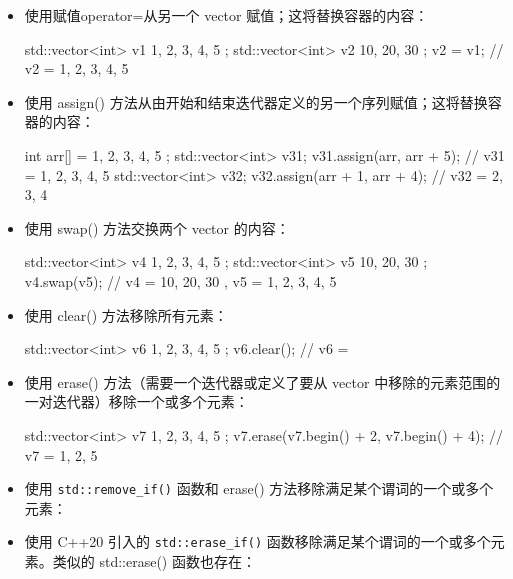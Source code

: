 \begin{itemize}
\item
使用赋值operator=从另一个 vector 赋值；这将替换容器的内容：

\begin{cpp}
std::vector<int> v1{ 1, 2, 3, 4, 5 };
std::vector<int> v2{ 10, 20, 30 };
v2 = v1; // v2 = { 1, 2, 3, 4, 5 }
\end{cpp}

\item
使用 assign() 方法从由开始和结束迭代器定义的另一个序列赋值；这将替换容器的内容：

\begin{cpp}
int arr[] = { 1, 2, 3, 4, 5 };
std::vector<int> v31;
v31.assign(arr, arr + 5);     // v31 = { 1, 2, 3, 4, 5 }
std::vector<int> v32;
v32.assign(arr + 1, arr + 4); // v32 = { 2, 3, 4 }
\end{cpp}

\item
使用 swap() 方法交换两个 vector 的内容：

\begin{cpp}
std::vector<int> v4{ 1, 2, 3, 4, 5 };
std::vector<int> v5{ 10, 20, 30 };
v4.swap(v5); // v4 = { 10, 20, 30 }, v5 = { 1, 2, 3, 4, 5 }
\end{cpp}

\item
使用 clear() 方法移除所有元素：

\begin{cpp}
std::vector<int> v6{ 1, 2, 3, 4, 5 };
v6.clear(); // v6 = { }
\end{cpp}

\item
使用 erase() 方法（需要一个迭代器或定义了要从 vector 中移除的元素范围的一对迭代器）移除一个或多个元素：

\begin{cpp}
std::vector<int> v7{ 1, 2, 3, 4, 5 };
v7.erase(v7.begin() + 2, v7.begin() + 4); // v7 = { 1, 2, 5 }
\end{cpp}

\item
使用 \verb|std::remove_if()| 函数和 erase() 方法移除满足某个谓词的一个或多个元素：


\item
使用 C++20 引入的 \verb|std::erase_if()| 函数移除满足某个谓词的一个或多个元素。类似的 std::erase() 函数也存在：

\end{itemize}

